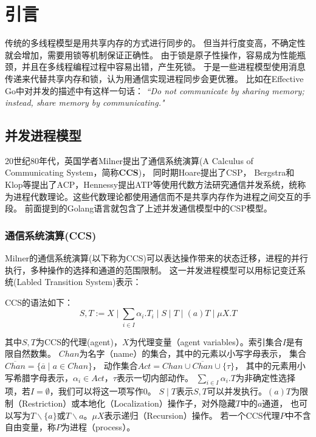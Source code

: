 
\chapter{引言}
   传统的多线程模型是用共享内存的方式进行同步的。
   但当并行度变高，不确定性就会增加，需要用锁等机制保证正确性。
   由于锁是原子性操作，容易成为性能瓶颈，并且在多线程编程过程中容易出错，产生死锁。
   于是一些进程模型使用消息传递来代替共享内存和锁，认为用通信实现进程同步会更优雅。
   比如在Effective Go中对并发的描述中有这样一句话：
   \textit{“Do not communicate by sharing memory; instead, share memory by communicating."}\cite{1}


   \section{并发进程模型}
   20世纪80年代，英国学者Milner提出了通信系统演算(A Calculus of Communicating System，简称\textbf{CCS})\cite{2}，
   同时期Hoare提出了CSP\cite{3}，
   Bergstra和Klop等提出了ACP\cite{4}，Hennessy提出ATP\cite{5}等使用代数方法研究通信并发系统，统称为进程代数理论。这些代数理论都使用通信而不是共享内存作为进程之间交互的手段。
   前面提到的Golang语言就包含了上述并发通信模型中的CSP模型。

   \subsection{通信系统演算(CCS)}
   Milner的通信系统演算(以下称为CCS)可以表达操作带来的状态迁移，进程的并行执行，多种操作的选择和通道的范围限制。
   这一并发进程模型可以用标记变迁系统(Labled Transition System)表示：

   CCS的语法如下：
   $$S,T:=X\mid \sum_{i\in I}\alpha_i.T_i\mid S\mid T \mid (a)T \mid \mu X.T$$

   其中$S,T$为CCS的代理(agent)，$X$为代理变量（agent variables）。索引集合$I$是有限自然数集。
   $Chan$为名字（name）的集合，其中的元素以小写字母表示，
   集合$\overline{Chan}=\{\overline{a}\mid a\in Chan\}$，
   动作集合$Act=Chan\cup \overline{Chan}\cup \{\tau\} $，
   其中的元素用小写希腊字母表示，$\alpha_i\in Act$，$\tau$表示一切内部动作。
   $\sum_{i\in I}\alpha_i.T$为非确定性选择项，若$I=\emptyset$，我们可以将这一项写作$0$。
   $S\mid T$表示$S,T$可以并发执行。$(a)T$为限制（Restriction）或本地化（Localization）操作子，对外隐藏$T$中的$a$通道，
   也可以写为$T\backslash \{a\}$或$T\backslash a$。$\mu X$表示递归（Recursion）操作。
   若一个CCS代理$P$中不含自由变量，称$P$为进程（process）。

